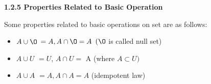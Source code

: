 \documentclass[10pt]{article}
\begin{document}
\large{\textbf{1.2.5 Properties Related to Basic Operation}}

\vspace*{0.2cm}
Some properties related to basic operations on set are as follows:

\vspace*{0.2cm}
\begin{itemize}
  \item $A \cup {\O}$ $= A, A \cap {\O} = A$ $({\O}$ is called null set)
  \item $A \cup U$ $= U$, $A \cap U =$ A (where $A \subset U)$
  \item $A \cup A$ $= A, A \cap A = A$ (idempotent law)
\end{itemize}
\end{document}
